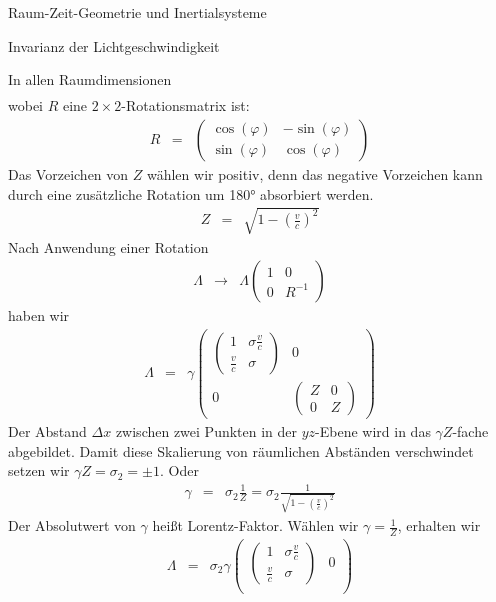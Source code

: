 \begin{chapter}{\titlestr}
\begin{section}{Raum-Zeit-Geometrie und Inertialsysteme}
\begin{subsection}{Invarianz der Lichtgeschwindigkeit}
\begin{subsubsection}{In allen Raumdimensionen}
\begin{eqnarray*}
\end{eqnarray*}
wobei $R$ eine $2\times 2$-Rotationsmatrix ist:
\begin{eqnarray*}
R &=&
\begin{pmatrix}
\cos(\varphi) & -\sin(\varphi)\\
\sin(\varphi) &\cos(\varphi)
\end{pmatrix}
\end{eqnarray*}
Das Vorzeichen von $Z$ wählen wir positiv, denn das negative Vorzeichen kann durch eine zusätzliche Rotation um 180° absorbiert werden.
\begin{eqnarray*}
Z &=& \sqrt{1-\left(\frac{v}{c}\right)^2}
\end{eqnarray*}
Nach Anwendung einer Rotation
\begin{eqnarray*}
\Lambda &\rightarrow& \Lambda \begin{pmatrix}
1 & 0\\
0 & R^{-1}
\end{pmatrix}
\end{eqnarray*}
haben wir
\begin{eqnarray*}
\Lambda &=&
\gamma
\begin{pmatrix}
\begin{pmatrix}
1 & \sigma\frac{v}{c}\\
\frac{v}{c} & \sigma
\end{pmatrix} & 0\\
0 & \begin{pmatrix}
Z & 0\\
0 & Z
\end{pmatrix}
\end{pmatrix}
\end{eqnarray*}
Der Abstand $\Delta x$ zwischen zwei Punkten in der $yz$-Ebene wird in das $\gamma Z$-fache abgebildet.
Damit diese Skalierung von räumlichen Abständen verschwindet setzen wir $\gamma Z=\sigma_2=\pm 1$. Oder
\begin{eqnarray*}
\gamma &=& \sigma_2 \frac{1}{Z} = \sigma_2 \frac{1}{\sqrt{1-\left(\frac{v}{c}\right)^2}}
\end{eqnarray*}
Der Absolutwert von $\gamma$ heißt Lorentz-Faktor. Wählen wir $\gamma = \frac{1}{Z}$, erhalten wir
\begin{eqnarray*}
\Lambda &=&
\sigma_2\gamma
\begin{pmatrix}
\begin{pmatrix}
1 & \sigma\frac{v}{c}\\
\frac{v}{c} & \sigma
\end{pmatrix} & 0\\

\end{pmatrix}
\end{eqnarray*}
\end{subsubsection}
\end{subsection}
\end{section}
\end{chapter}
